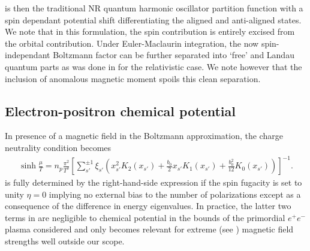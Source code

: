  is then the traditional NR quantum harmonic oscillator partition function with a spin dependant potential shift differentiating the aligned and anti-aligned states. We note that in this formulation, the spin contribution is entirely excised from the orbital contribution. Under Euler-Maclaurin integration, the now spin-independant Boltzmann factor can be further separated into `free' and Landau quantum parts as was done in  for the relativistic case. We note however that the inclusion of anomalous magnetic moment spoils this clean separation.

\subsection{Electron-positron chemical potential}
\label{sec:chem}
\noindent In presence of a magnetic field in the Boltzmann approximation, the charge neutrality condition  becomes
\begin{gather}
 \label{chem}
 \sinh\frac{\mu}{T}=n_{p}\frac{\pi^{2}}{T^{3}}
 \left[\sum_{s'}^{\pm1}\xi_{s'}\!\left(\!x_{s'}^{2}K_{2}(x_{s'})\!+\!\frac{b_{0}}{2}x_{s'}K_{1}(x_{s'})\!+\!\frac{b_{0}^{2}}{12}K_{0}(x_{s'}\!)\!\right)\!\right]^{-1}\!.
\end{gather}
 is fully determined by the right-hand-side expression if the spin fugacity is set to unity $\eta=0$ implying no external bias to the number of polarizations except as a consequence of the difference in energy eigenvalues. In practice, the latter two terms in  are negligible to chemical potential in the bounds of the primordial $e^{+}e^{-}$ plasma considered and only becomes relevant for extreme (see ) magnetic field strengths well outside our scope.

